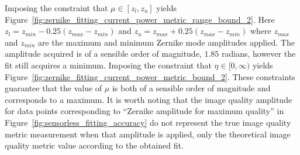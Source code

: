 Imposing the constraint that $\mu \in [z_{l}, z_{u}]$ yields 
Figure~\ref{fig:zernike_fitting_current_power_metric_range_bound_2}. Here 
$z_{l} = z_{min} - 0.25(z_{max}-z_{min})$ and $z_{u} = z_{max} + 
0.25(z_{max}-z_{min})$ where $z_{max}$ and $z_{min}$ are the maximum and 
minimum Zernike mode amplitudes applied. The amplitude acquired is of a 
sensible order of magnitude, $1.85$ radians, however the fit still acquires 
a minimum. Imposing the constraint that $\eta \in [0, \infty)$ 
yields Figure~\ref{fig:zernike_fitting_current_power_metric_bound_2}. These 
constraints guarantee that the value of $\mu$ is both of a sensible 
order of magnitude and corresponds to a maximum. It is worth noting that 
the image quality amplitude for data points corresponding to ``Zernike 
amplitude for maximum quality'' in 
Figure~\ref{fig:sensorless_fitting_accuracy} do not represent the true 
image quality metric measurement when that amplitude is applied, only the 
theoretical image quality metric value according to the obtained fit. 

